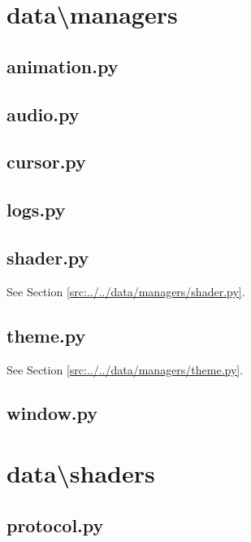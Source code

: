 \documentclass[../main/main.tex]{subfiles}
\begin{document}
\section{data\textbackslash managers}
\subsection{animation.py}

\label{src:data/managers/animation.py}

\subsection{audio.py}

\label{src:data/managers/audio.py}

\subsection{cursor.py}

\label{src:data/managers/cursor.py}

\subsection{logs.py}

\label{src:data/managers/logs.py}

\subsection{shader.py}
See Section \ref{src:../../data/managers/shader.py}.

\subsection{theme.py}
See Section \ref{src:../../data/managers/theme.py}.

\subsection{window.py}

\label{src:data/managers/window.py}

\section{data\textbackslash shaders}
\subsection{protocol.py}

\label{src:data/shaders/protocol.py}
\end{document}
